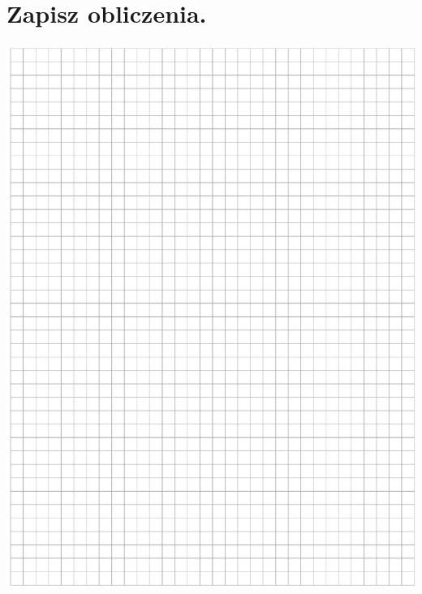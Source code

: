 \documentclass[10pt]{article}
\begin{document}
\section*{Zapisz obliczenia.}
\begin{center}
\includegraphics[max width=\textwidth]{2024_11_21_f1ecc00f5c4ab21f0d04g-10}
\end{center}
\end{document}
